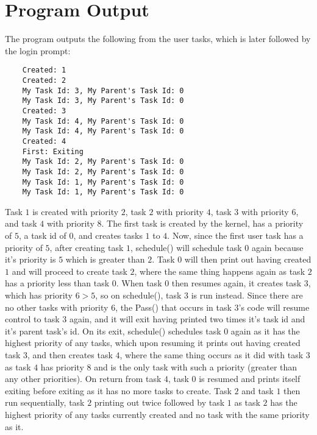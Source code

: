 \documentclass[12pt]{article}
\begin{document}
\section{Program Output}
The program outputs the following from the user tasks, which is later followed by the login prompt:
\begin{center}
  \begin{verbatim}
    Created: 1
    Created: 2
    My Task Id: 3, My Parent's Task Id: 0
    My Task Id: 3, My Parent's Task Id: 0
    Created: 3
    My Task Id: 4, My Parent's Task Id: 0
    My Task Id: 4, My Parent's Task Id: 0
    Created: 4
    First: Exiting
    My Task Id: 2, My Parent's Task Id: 0
    My Task Id: 2, My Parent's Task Id: 0
    My Task Id: 1, My Parent's Task Id: 0
    My Task Id: 1, My Parent's Task Id: 0
  \end{verbatim}
\end{center}
Task $1$ is created with priority $2$, task $2$ with priority $4$, task $3$ with priority $6$, and task $4$ with priority $8$.  The first task is created by the kernel, has a priority of $5$, a task id of $0$, and creates tasks $1$ to $4$.  Now, since the first user task has a priority of $5$, after creating task $1$, \textmd{schedule()} will schedule task $0$ again because it's priority is $5$ which is greater than $2$.  Task $0$ will then print out having created $1$ and will proceed to create task $2$, where the same thing happens again as task $2$ has a priority less than task $0$.  When task $0$ then resumes again, it creates task $3$, which has priority $6 > 5$, so on \textmd{schedule()}, task $3$ is run instead.  Since there are no other tasks with priority $6$, the \textmd{Pass()} that occurs in task $3$'s code will resume control to task $3$ again, and it will exit having printed two times it's task id and it's parent task's id.  On its exit, \textmd{schedule()} schedules task $0$ again as it has the highest priority of any tasks, which upon resuming it prints out having created task $3$, and then creates task $4$, where the same thing occurs as it did with task $3$ as task $4$ has priority $8$ and is the only task with such a priority (greater than any other priorities).  On return from task $4$, task $0$ is resumed and prints itself exiting before exiting as it has no more tasks to create.  Task $2$ and task $1$ then run sequentially, task $2$ printing out twice followed by task $1$ as task $2$ has the highest priority of any tasks currently created and no task with the same priority as it. \\[2\baselineskip]
\end{document}
